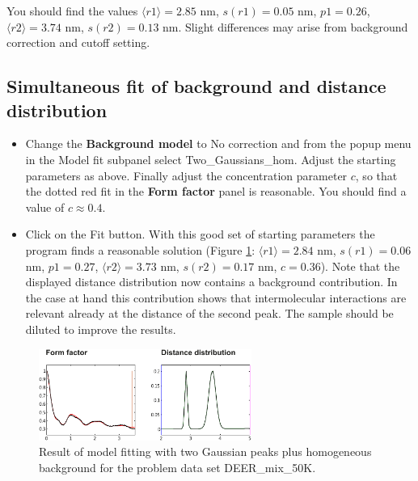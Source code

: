 \documentclass[11pt,a4paper]{article}
\begin{document}
You should find the values $\langle r1 \rangle = 2.85$ nm, $s(r1) = 0.05$ nm, $p1 = 0.26$, $\langle r2 \rangle = 3.74$ nm, $s(r2) = 0.13$ nm. Slight differences may arise from background correction and cutoff setting.

\subsection{Simultaneous fit of background and distance distribution}

\begin{itemize}
	\item Change the {\ttfamily \bf Background model} to {\ttfamily No correction} and from the popup menu in the {\ttfamily Model fit} subpanel select {\ttfamily Two\_Gaussians\_hom}. Adjust the starting parameters as above. Finally adjust the concentration parameter $c$, so that the dotted red fit in the {\ttfamily \bf Form factor} panel is reasonable. You should find a value of $c \approx 0.4$.
	\item Click on the {\ttfamily Fit} button. With this good set of starting parameters the program finds a reasonable solution (Figure \ref{fig:8}: $\langle r1 \rangle = 2.84$ nm, $s(r1) = 0.06$ nm, $p1 = 0.27$, $\langle r2 \rangle = 3.73$ nm, $s(r2) = 0.17$ nm, $c = 0.36$). Note that the displayed distance distribution now contains a background contribution. In the case at hand this contribution shows that intermolecular interactions are relevant already at the distance of the second peak. The sample should be diluted to improve the results. 
\end{itemize}

\begin{figure}[ht]
 \vspace{10mm}
 	\begin{center}
		\includegraphics[width=0.62\textwidth]{figure8.pdf}
	\end{center}
	\caption{Result of model fitting with two Gaussian peaks plus homogeneous background for the problem data set {\ttfamily DEER\_mix\_50K}. }
	\label{fig:8}
\end{figure}
\end{document}
